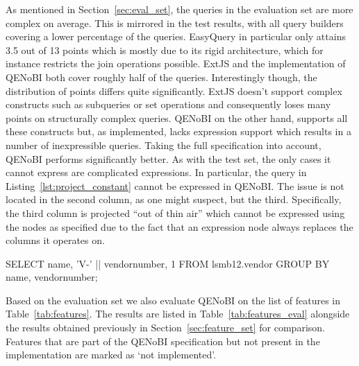 \documentclass[11pt,a4paper]{globis-book}
\begin{document}
As mentioned in Section~\ref{sec:eval_set}, the queries in the evaluation set are more complex on average. This is mirrored in the test results, with all query builders covering a lower percentage of the queries. EasyQuery in particular only attains 3.5 out of 13 points which is mostly due to its rigid architecture, which for instance restricts the join operations possible. ExtJS and the implementation of QENoBI both cover roughly half of the queries. Interestingly though, the distribution of points differs quite significantly. ExtJS doesn't support complex constructs such as subqueries or set operations and consequently loses many points on structurally complex queries. QENoBI on the other hand, supports all these constructs but, as implemented, lacks expression support which results in a number of inexpressible queries. Taking the full specification into account, QENoBI performs significantly better. As with the test set, the only cases it cannot express are complicated expressions. In particular, the query in Listing~\ref{lst:project_constant} cannot be expressed in QENoBI. The issue is not located in the second column, as one might suspect, but the third. Specifically, the third column is projected ``out of thin air'' which cannot be expressed using the nodes as specified due to the fact that an expression node always replaces the columns it operates on.

\begin{codeex}[caption=Query projecting a constant, label=lst:project_constant]
SELECT
  name, 'V-' || vendornumber, 1
FROM
  lsmb12.vendor
GROUP BY
  name, vendornumber;
\end{codeex}

Based on the evaluation set we also evaluate QENoBI on the list of features in Table~\ref{tab:features}. The results are listed in Table~\ref{tab:features_eval} alongside the results obtained previously in Section~\ref{sec:feature_set} for comparison. Features that are part of the QENoBI specification but not present in the implementation are marked as `not implemented'.
\end{document}
